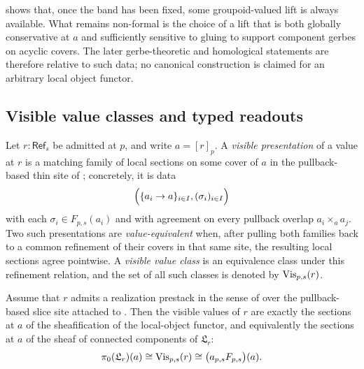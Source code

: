 \begin{remark}\label{rem:gluing-sensitive-lifts}
 shows that, once the band has been fixed, some groupoid-valued lift is always available. What remains non-formal is the choice of a lift that is both globally conservative at $a$ and sufficiently sensitive to gluing to support component gerbes on acyclic covers. The later gerbe-theoretic and homological statements are therefore relative to such data; no canonical construction is claimed for an arbitrary local object functor.
\end{remark}

\subsection{Visible value classes and typed readouts}

\begin{definition}\label{def:visible-value-classes}
Let $r:\mathsf{Ref}_s$ be admitted at $p$, and write $a=[r]_p$. A \emph{visible presentation} of a value at $r$ is a matching family of local sections on some cover of $a$ in the pullback-based thin site of ; concretely, it is data
\[
\Bigl(\{a_i\to a\}_{i\in I},(\sigma_i)_{i\in I}\Bigr)
\]
with each $\sigma_i\in F_{p,s}(a_i)$ and with agreement on every pullback overlap $a_i\times_a a_j$. Two such presentations are \emph{value-equivalent} when, after pulling both families back to a common refinement of their covers in that same site, the resulting local sections agree pointwise. A \emph{visible value class} is an equivalence class under this refinement relation, and the set of all such classes is denoted by $\mathrm{Vis}_{p,s}(r)$.
\end{definition}


\begin{proposition}\label{thm:visible-value-components}
Assume that $r$ admits a realization prestack in the sense of  over the pullback-based slice site attached to . Then the visible values of $r$ are exactly the sections at $a$ of the sheafification of the local-object functor, and equivalently the sections at $a$ of the sheaf of connected components of $\mathfrak L_r$:
\[
\pi_0(\mathfrak L_r)(a)\cong \mathrm{Vis}_{p,s}(r)\cong \bigl(a_{p,s}F_{p,s}\bigr)(a).
\]
\end{proposition}

